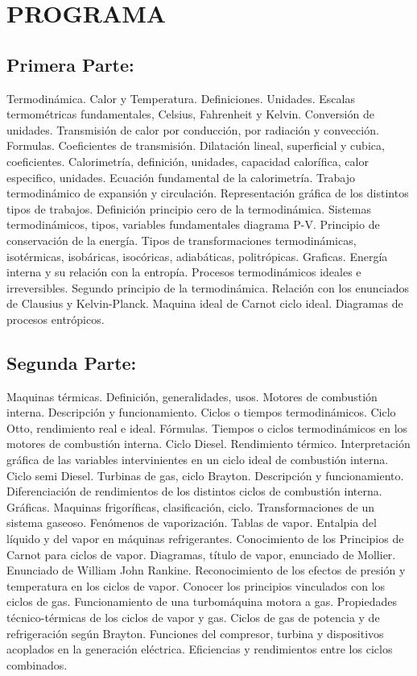 \documentclass[planificacion.tex]{subfiles}
\begin{document}
\section*{\centering PROGRAMA \ano}


\subsection*{Primera Parte:}  	Termodinámica. Calor y Temperatura. Definiciones. Unidades. Escalas termométricas fundamentales, Celsius, Fahrenheit y Kelvin. Conversión de unidades. Transmisión de calor por conducción, por radiación y convección. Formulas. Coeficientes de transmisión. 
Dilatación lineal, superficial y cubica, coeficientes. Calorimetría, definición, unidades, capacidad calorífica, calor especifico, unidades. Ecuación fundamental de la calorimetría. Trabajo termodinámico de expansión y circulación. Representación gráfica de los distintos tipos de trabajos. Definición principio cero de la termodinámica. Sistemas termodinámicos,  tipos, variables fundamentales diagrama P-V. Principio de conservación de la energía. Tipos de transformaciones termodinámicas, isotérmicas, isobáricas, isocóricas, adiabáticas, politrópicas. Graficas. Energía interna y su relación con la entropía. Procesos termodinámicos ideales e irreversibles. Segundo principio de la termodinámica. Relación con los enunciados de  Clausius y Kelvin-Planck. Maquina ideal de Carnot ciclo ideal. Diagramas de procesos entrópicos.
\subsection*{Segunda Parte:}  Maquinas térmicas. Definición, generalidades, usos. Motores de combustión interna. Descripción y funcionamiento.  Ciclos o tiempos termodinámicos. Ciclo Otto, rendimiento real e ideal. Fórmulas. Tiempos o ciclos termodinámicos en los motores de combustión interna. Ciclo Diesel. Rendimiento térmico. Interpretación gráfica de las variables intervinientes en un ciclo ideal de combustión interna. Ciclo semi Diesel. Turbinas de gas, ciclo Brayton. Descripción y funcionamiento.    Diferenciación de rendimientos de los distintos ciclos de combustión interna. Gráficas. Maquinas frigoríficas, clasificación, ciclo. 
Transformaciones de un sistema gaseoso. Fenómenos de vaporización. Tablas de vapor. Entalpia del líquido y del vapor en máquinas refrigerantes. Conocimiento de los Principios de Carnot para ciclos de vapor. Diagramas, título de vapor,  enunciado de Mollier.  Enunciado de William John Rankine. Reconocimiento de los efectos de presión y temperatura en los ciclos de vapor. Conocer los principios vinculados con los ciclos de gas. Funcionamiento de una turbomáquina motora a gas. Propiedades técnico-térmicas de los ciclos de vapor y gas. Ciclos de gas de potencia y de refrigeración según Brayton. Funciones del compresor, turbina y dispositivos acoplados en la generación eléctrica. Eficiencias y rendimientos entre los ciclos combinados.
\end{document}
